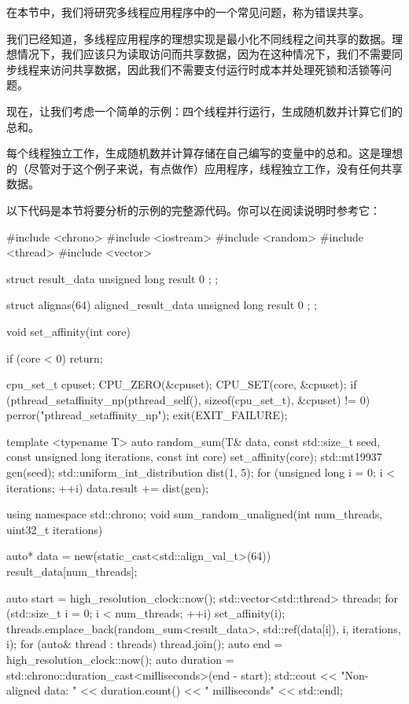 在本节中，我们将研究多线程应用程序中的一个常见问题，称为错误共享。

我们已经知道，多线程应用程序的理想实现是最小化不同线程之间共享的数据。理想情况下，我们应该只为读取访问而共享数据，因为在这种情况下，我们不需要同步线程来访问共享数据，因此我们不需要支付运行时成本并处理死锁和活锁等问题。

现在，让我们考虑一个简单的示例：四个线程并行运行，生成随机数并计算它们的总和。

每个线程独立工作，生成随机数并计算存储在自己编写的变量中的总和。这是理想的（尽管对于这个例子来说，有点做作）应用程序，线程独立工作，没有任何共享数据。

以下代码是本节将要分析的示例的完整源代码。你可以在阅读说明时参考它：

\begin{cpp}
#include <chrono>
#include <iostream>
#include <random>
#include <thread>
#include <vector>

struct result_data {
    unsigned long result { 0 };
};

struct alignas(64) aligned_result_data {
    unsigned long result { 0 };
};

void set_affinity(int core) {
    if (core < 0) {
        return;
    }

    cpu_set_t cpuset;
    CPU_ZERO(&cpuset);
    CPU_SET(core, &cpuset);
    if (pthread_setaffinity_np(pthread_self(), sizeof(cpu_set_t),
    &cpuset) != 0) {
        perror("pthread_setaffinity_np");
        exit(EXIT_FAILURE);
    }
}

template <typename T>
auto random_sum(T& data, const std::size_t seed, const unsigned long
iterations, const int core) {
    set_affinity(core);
    std::mt19937 gen(seed);
    std::uniform_int_distribution dist(1, 5);
    for (unsigned long i = 0; i < iterations; ++i) {
        data.result += dist(gen);
    }
}

using namespace std::chrono;
void sum_random_unaligned(int num_threads, uint32_t iterations) {
    auto* data = new(static_cast<std::align_val_t>(64)) result_data[num_threads];

    auto start = high_resolution_clock::now();
    std::vector<std::thread> threads;
    for (std::size_t i = 0; i < num_threads; ++i) {
        set_affinity(i);
        threads.emplace_back(random_sum<result_data>, std::ref(data[i]), i, iterations, i);
    }
    for (auto& thread : threads) {
        thread.join();
    }
    auto end = high_resolution_clock::now();
    auto duration = std::chrono::duration_cast<milliseconds>(end - start);
    std::cout << "Non-aligned data: " << duration.count() << " milliseconds" << std::endl;

}
\end{cpp}
